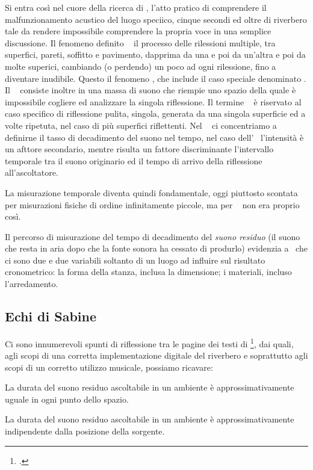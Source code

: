 Si entra così nel cuore della ricerca di \ws, l'atto pratico di comprendere il
malfunzionamento acustico del luogo speciico, cinque secondi ed oltre di riverbero
tale da rendere impossibile comprendere la propria voce in una semplice discussione.
Il fenomeno definito \rev~ il processo delle rilessioni multiple,
tra superfici, pareti, soffitto e pavimento, dapprima da una e poi da un'altra e
poi da molte superici, cambiando (o perdendo) un poco ad ogni rilessione, fino
a diventare inudibile. Questo il fenomeno \rev, che include il caso
speciale denominato \eco. Il \rev~ consiste inoltre in una massa
di suono che riempie uno spazio della quale è impossibile cogliere ed analizzare
la singola riflessione. Il termine \eco~ è riservato al caso specifico di
riflessione pulita, singola, generata da una singola superficie ed a volte ripetuta,
nel caso di più superfici riflettenti. Nel \rev~ ci concentriamo a definirne il
tasso di decadimento del suono nel tempo, nel caso dell'\eco~ l'intensità è un
afttore secondario, mentre risulta un fattore discriminante l'intervallo temporale
tra il suono originario ed il tempo di arrivo della riflessione all'ascoltatore.

La misurazione temporale diventa quindi fondamentale, oggi piuttosto scontata
per misurazioni fisiche di ordine infinitamente piccole, ma per \ws~ non era proprio
così.

Il percorso di misurazione del tempo di decadimento del \emph{suono residuo} (il
suono che resta in aria dopo che la fonte sonora ha cessato di produrlo) evidenzia
a \ws~che ci sono due e due variabili soltanto di un luogo  ad influire sul
risultato cronometrico: la forma della stanza, inclusa la dimensione; i materiali,
incluso l'arredamento.

\subsection{Echi di Sabine}

Ci sono innumerevoli spunti di riflessione tra le pagine dei testi di \ws\footcite{ws:rev},
dai quali, agli scopi di una corretta implementazione digitale del riverbero e
soprattutto agli scopi di un corretto utilizzo musicale, possiamo ricavare:

\begin{compactitem}
  \item La durata del suono residuo ascoltabile in un ambiente è approssimativamente
  uguale in ogni punto dello spazio.
  \item La durata del suono residuo ascoltabile in un ambiente è approssimativamente
  indipendente dalla posizione della sorgente.
\end{compactitem}

